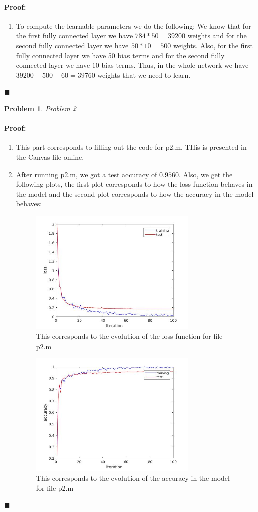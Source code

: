 \documentclass[12pt]{article}
\newenvironment{proof}{\paragraph{Proof: }}{\hfill$\blacksquare$}
\newtheorem{problem}{Problem}%
\begin{document}
\begin{proof}
\begin{enumerate}
\item To compute the learnable parameters we do the following: We know that for the first fully connected layer we have $784*50 = 39200$ weights and for the second fully connected layer we have $50*10 = 500$ weights. Also, for the first fully connected layer we have 50 bias terms and for the second fully connected layer we have $10$ bias terms. Thus, in the whole network we have $39200 + 500 + 60 = 39760$ weights that we need to learn.

\end{enumerate}
\end{proof}


\begin{problem}
\normalfont
Problem 2
\end{problem}

\begin{proof}

\begin{enumerate}
\item This part corresponds to filling out the code for p2.m. THis is presented in the Canvas file online.

\item After running p2.m, we got a test accuracy of $0.9560$. Also, we get the following plots, the first plot corresponds to how the loss function behaves in the model and the second plot corresponds to how the accuracy in the model behaves:

\begin{figure}[!htbp]
\centering
\includegraphics[width=8cm]{loss_p2.jpg}
\caption{This corresponds to the evolution of the loss function for file p2.m}
\end{figure}

\begin{figure}[!htbp]
\centering
\includegraphics[width=8cm]{accuracy_p2.jpg}
\caption{This corresponds to the evolution of the accuracy in the model for file p2.m}
\end{figure}



\end{enumerate}
\end{proof}
\end{document}
